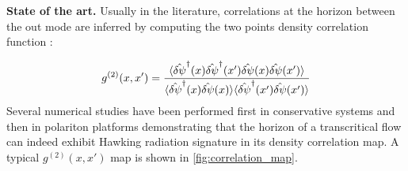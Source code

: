 \bigskip

 \textbf{State of the art.} Usually in the literature, correlations at the horizon 
 between the out mode are inferred by computing the two points density correlation function \cite{Recati_acousticHR_2009, nguyen_acoustic_2015} :

 \begin{equation}
    g^{(2)}(x,x')=\dfrac{\langle{\hat{\delta\psi}}^\dagger(x)\hat{\delta\psi}^\dagger(x')\hat{\delta\psi}(x)\hat{\delta\psi}(x')\rangle}{\langle \hat{\delta\psi}^\dagger(x)\hat{\delta\psi}(x)\rangle\langle \hat{\delta\psi}^\dagger(x')\hat{\delta\psi}(x')\rangle}
 \end{equation}
Several numerical studies have been performed first in conservative systems \cite{carusotto_numerical_2008} and then in polariton platforms \cite{nguyen_acoustic_2015,jacquet_quantum_2023} demonstrating that the horizon of a transcritical flow can indeed exhibit Hawking radiation signature in its density correlation map. 
A typical $g^(2)(x,x')$ map is shown in \autoref{fig:correlation_map}.

